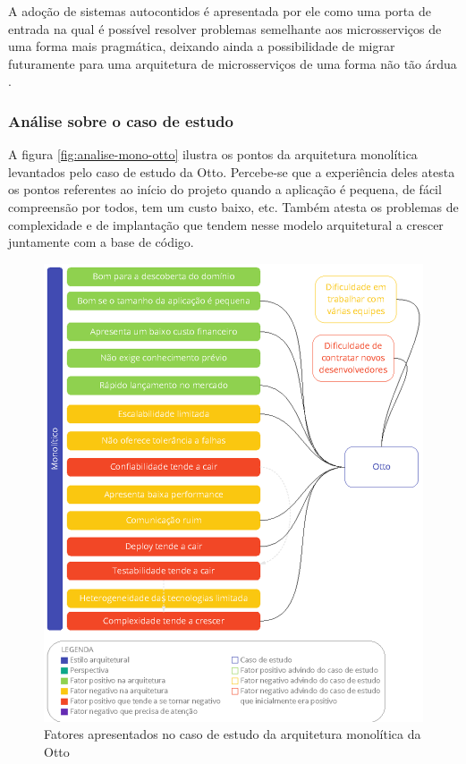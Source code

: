 A adoção de sistemas autocontidos é apresentada por ele como uma porta de entrada na qual é possível
resolver problemas semelhante aos microsserviços de uma forma mais pragmática, deixando ainda a
possibilidade de migrar futuramente para uma arquitetura de microsserviços de uma forma não tão
árdua \cite{Guido2016:WhyMicroservices}.
    
\subsubsection{Análise sobre o caso de estudo}

A figura \autoref{fig:analise-mono-otto} ilustra os pontos da arquitetura monolítica levantados pelo
caso de estudo da Otto. Percebe-se que a experiência deles atesta os pontos referentes ao início do
projeto quando a aplicação é pequena, de fácil compreensão por todos, tem um custo baixo, etc.
Também atesta os problemas de complexidade e de implantação que tendem nesse modelo arquitetural a
crescer juntamente com a base de código.


\begin{figure}[h]
  \centering
  \includegraphics[keepaspectratio=true,scale=1]{figuras/monoOtto.eps}
  \caption{Fatores apresentados no caso de estudo da arquitetura monolítica da Otto\label{fig:analise-mono-otto}}
\end{figure}

